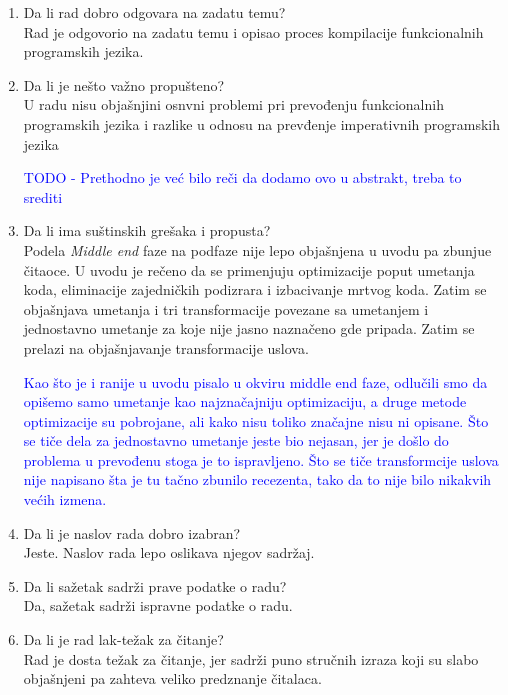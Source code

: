 \documentclass[a4paper]{report}
\newcommand{\odgovor}[1]{\textcolor{blue}{#1}}
\begin{document}
	\begin{enumerate}
		
		\item Da li rad dobro odgovara na zadatu temu?\\
		Rad je odgovorio na zadatu temu i opisao proces kompilacije funkcionalnih programskih jezika.
		
		\item Da li je nešto važno propušteno?\\
		U radu nisu objašnjini osnvni problemi pri prevođenju funkcionalnih programskih jezika i razlike u odnosu na prevđenje imperativnih programskih jezika
		
		\odgovor{TODO - Prethodno je već bilo reči da dodamo ovo u abstrakt, treba to srediti}
		
		\item Da li ima suštinskih grešaka i propusta?\\
		Podela \emph{Middle end} faze na podfaze nije lepo objašnjena u uvodu pa zbunjue čitaoce. U uvodu je rečeno da se primenjuju  optimizacije poput umetanja koda, eliminacije zajedničkih podizrara i izbacivanje mrtvog koda. Zatim se objašnjava umetanja i tri transformacije povezane sa umetanjem i jednostavno umetanje za koje nije jasno naznačeno gde pripada. Zatim se prelazi na objašnjavanje transformacije uslova.
		
		\odgovor{Kao što je i ranije u uvodu pisalo u okviru middle end faze, odlučili smo da opišemo samo umetanje kao najznačajniju optimizaciju, a druge metode optimizacije su pobrojane, ali kako nisu toliko značajne nisu ni opisane. Što se tiče dela za jednostavno umetanje jeste bio nejasan, jer je došlo do problema u prevođenu stoga je to ispravljeno. Što se tiče transformcije uslova nije napisano šta je tu tačno zbunilo recezenta, tako da to nije bilo nikakvih većih izmena.}
		
		\item Da li je naslov rada dobro izabran?\\
		Jeste. Naslov rada lepo oslikava njegov sadržaj.
		
		\item Da li sažetak sadrži prave podatke o radu?\\
		Da, sažetak sadrži ispravne podatke o radu.
		
		\item Da li je rad lak-težak za čitanje?\\
		Rad je dosta težak za čitanje, jer sadrži puno stručnih izraza koji su slabo objašnjeni pa zahteva veliko predznanje čitalaca. 
		

\end{enumerate}
\end{document}
